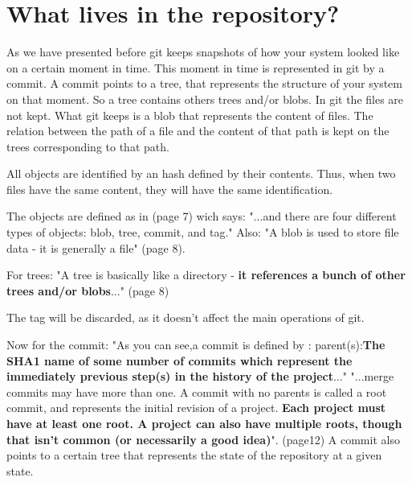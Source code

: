 \section{What lives in the repository?}

As we have presented before git keeps snapshots of how your system
looked like on a certain moment in time. This moment in time is
represented in git by a commit. A commit points to a tree, that
represents the structure of your system on that moment. So a tree
contains others trees and/or blobs. In git the files are not kept. 
What git keeps is a blob that represents the content of files. The
relation between the path of a file and the content of that path 
is kept on the trees corresponding to that path. \par

All objects are identified by an hash 
defined by their contents. Thus, when two files have the same
content, they will have the same identification. \par

The objects are defined as in \cite{gitComm} (page 7) wich says: 
"...and there are four different types of objects: blob,
tree, commit, and tag."
Also: "A blob is used to store file data - it is generally a file" 
\cite{gitComm} (page 8). \par
For trees: "A tree is basically like a directory 
- {\bf it references a bunch
of other trees and/or blobs}..." (page 8) \par 


The tag will be discarded, as it doesn't affect the main operations
of git. \par 

Now for the commit:  
"As you can see,a commit is defined by : 
parent(s):{\bf The SHA1 name of some number of commits which
represent the immediately previous step(s) in the 
history of the project}..."
"...merge commits may have more than one. A commit with no 
parents is called a root commit, and represents the 
initial revision of a project. {\bf Each project must have at
least one root. A project can also have multiple roots,
though that isn't common (or necessarily a good idea)}". 
\cite{gitComm} (page12) 
A commit also points to a certain tree that represents the state of the
repository at a given state. \par





